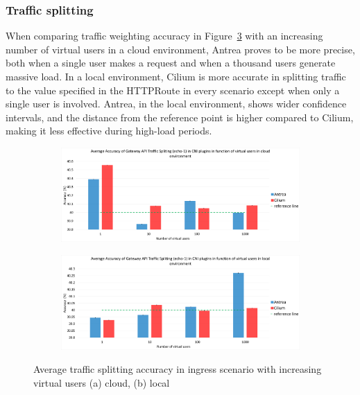 \subsubsection{Traffic splitting}
\label{sec:ingressTrafficSplitting}

When comparing traffic weighting accuracy in Figure~\ref{fig:vus_avg} with an increasing number of virtual users in a cloud environment, Antrea proves to be more precise, both when a single user makes a request and when a thousand users generate massive load. In a local environment, Cilium is more accurate in splitting traffic to the value specified in the HTTPRoute in every scenario except when only a single user is involved. Antrea, in the local environment, shows wider confidence intervals, and the distance from the reference point is higher compared to Cilium, making it less effective during high-load periods.


\begin{figure}[H]
    \centering
    \begin{subfigure}[b]{1\textwidth}
        \includegraphics[width=\textwidth]{plots/traffic-splitting/vus_cloud_all.png}
        \caption{}
        \label{fig:vus_cloud_avg}
    \end{subfigure}
    \begin{subfigure}[b]{1\textwidth}
        \includegraphics[width=\textwidth]{plots/traffic-splitting/vus_local_all.png}
        \caption{}
        \label{fig:vus_local_avg}
    \end{subfigure}
    
    \caption{Average traffic splitting accuracy in ingress scenario with increasing virtual users (a) cloud, (b) local}
    \label{fig:vus_avg}
\end{figure}


